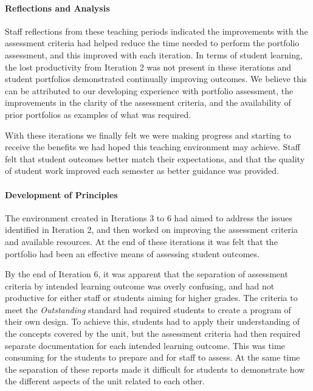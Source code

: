 

\paragraph{Reflections and Analysis} %

Staff reflections from these teaching periods indicated the improvements with the assessment criteria had helped reduce the time needed to perform the portfolio assessment, and this improved with each iteration. In terms of student learning, the lost productivity from Iteration 2 was not present in these iterations and student portfolios demonstrated continually improving outcomes. We believe this can be attributed to our developing experience with portfolio assessment, the improvements in the clarity of the assessment criteria, and the availability of prior portfolios as examples of what was required.

With these iterations we finally felt we were making progress and starting to receive the benefits we had hoped this teaching environment may achieve. Staff felt that student outcomes better match their expectations, and that the quality of student work improved each semester as better guidance was provided.

\paragraph{Development of Principles} %

The environment created in Iterations 3 to 6 had aimed to address the issues identified in Iteration 2, and then worked on improving the assessment criteria and available resources. At the end of these iterations it was felt that the portfolio had been an effective means of assessing student outcomes.

By the end of Iteration 6, it was apparent that the separation of assessment criteria by intended learning outcome was overly confusing, and had not productive for either staff or students aiming for higher grades. The criteria to meet the \emph{Outstanding} standard had required students to create a program of their own design. To achieve this, students had to apply their understanding of the concepts covered by the unit, but the assessment criteria had then required separate documentation for each intended learning outcome. This was time consuming for the students to prepare and for staff to assess. At the same time the separation of these reports made it difficult for students to demonstrate how the different aspects of the unit related to each other.

